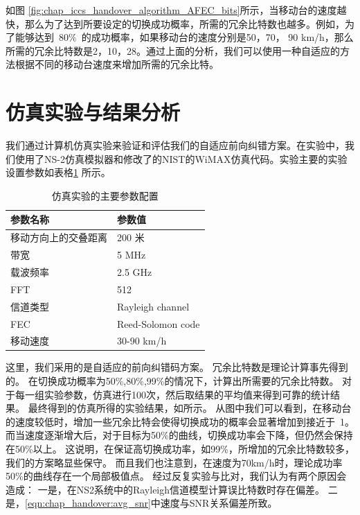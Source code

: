 
如图 \ref{fig:chap_iccs_handover_algorithm_AFEC_bits}所示，当移动台的速度越快，那么为了达到所要设定的切换成功概率，所需的冗余比特数也越多。例如，为了能够达到~$80\%$~的成功概率，如果移动台的速度分别是50，70， 90 km/h，那么所需的冗余比特数是2，10，28。通过上面的分析，我们可以使用一种自适应的方法根据不同的移动台速度来增加所需的冗余比特。

\section{仿真实验与结果分析}
我们通过计算机仿真实验来验证和评估我们的自适应前向纠错方案。在实验中，我们使用了NS-2仿真模拟器和修改了的NIST的WiMAX仿真代码。实验主要的实验设置参数如表格\ref{chap_iccs_table_I} 所示。

\begin{table}[htbp]
\wuhao
\centering
\caption{仿真实验的主要参数配置}\label{chap_iccs_table_I}
\begin{tabular*}{0.99\textwidth}{p{7cm} p{7cm}} 
\toprule 
参数名称  & 参数值 \\
\midrule
移动方向上的交叠距离  & 200 米\tabularnewline 
带宽  & 5 MHz\tabularnewline 
载波频率  & 2.5 GHz\tabularnewline 
FFT   & 512\tabularnewline
信道类型  & Rayleigh channel\tabularnewline 
FEC  & Reed-Solomon code\tabularnewline 
移动速度  & 30-90 km/h\\
\bottomrule
\end{tabular*}
\end{table}

这里，我们采用的是自适应的前向纠错码方案。
冗余比特数是理论计算事先得到的。
在切换成功概率为50\%,80\%,99\%的情况下，计算出所需要的冗余比特数。
对于每一组实验参数，仿真进行100次，然后取结果的平均值来得到可靠的统计结果。
最终得到的仿真所得的实验结果，如所示。
从图中我们可以看到，在移动台的速度较低时，增加一些冗余比特会使得切换成功的概率会显著增加到接近于~1。
而当速度逐渐增大后，对于目标为50\%的曲线，切换成功率会下降，但仍然会保持在50\%以上。
这说明，在保证高切换成功率，如99\%，所增加的冗余比特数较多，我们的方案略显些保守。
而且我们也注意到，在速度为70km/h时，理论成功率50\%的曲线存在一个局部极值点。
经过反复实验与比对，我们认为有两个原因会造成：
一是，在NS2系统中的Rayleigh信道模型计算误比特数时存在偏差。
二是，\eqref{eqn:chap_handover:avg_snr}中速度与SNR关系偏差所致。

